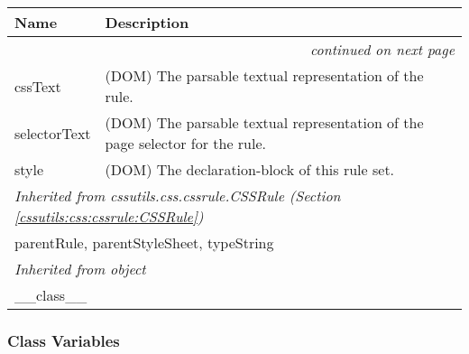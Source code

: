     \vspace{-1cm}
\hspace{\varindent}\begin{longtable}{|p{\varnamewidth}|p{\vardescrwidth}|l}
\cline{1-2}
\cline{1-2} \centering \textbf{Name} & \centering \textbf{Description}& \\
\cline{1-2}
\endhead\cline{1-2}\multicolumn{3}{r}{\small\textit{continued on next page}}\\\endfoot\cline{1-2}
\endlastfoot\raggedright c\-s\-s\-T\-e\-x\-t\- & \raggedright (DOM) The parsable textual representation of the rule.&\\
\cline{1-2}
\raggedright s\-e\-l\-e\-c\-t\-o\-r\-T\-e\-x\-t\- & \raggedright (DOM) The parsable textual representation of the page selector for the rule.&\\
\cline{1-2}
\raggedright s\-t\-y\-l\-e\- & \raggedright (DOM) The declaration-block of this rule set.&\\
\cline{1-2}
\multicolumn{2}{|l|}{\textit{Inherited from cssutils.css.cssrule.CSSRule \textit{(Section \ref{cssutils:css:cssrule:CSSRule})}}}\\
\multicolumn{2}{|p{\varwidth}|}{\raggedright parentRule, parentStyleSheet, typeString}\\
\cline{1-2}
\multicolumn{2}{|l|}{\textit{Inherited from object}}\\
\multicolumn{2}{|p{\varwidth}|}{\raggedright \_\_class\_\_}\\
\cline{1-2}
\end{longtable}



  \subsubsection{Class Variables}

